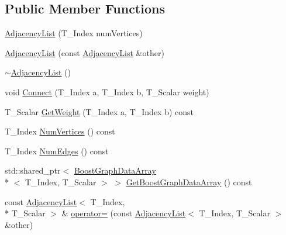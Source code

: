 \subsection*{Public Member Functions}
\begin{DoxyCompactItemize}
\item 
\hyperlink{class_undirected_weighted_graph_1_1_adjacency_list_a1a7c702a7ccd8ef53d155076961134cc}{Adjacency\+List} (T\+\_\+\+Index num\+Vertices)
\item 
\hyperlink{class_undirected_weighted_graph_1_1_adjacency_list_aec4427408ab6b840b2005e7e0273581d}{Adjacency\+List} (const \hyperlink{class_undirected_weighted_graph_1_1_adjacency_list}{Adjacency\+List} \&other)
\item 
\hyperlink{class_undirected_weighted_graph_1_1_adjacency_list_acb6a788f835b7b7417087b05c9932d64}{$\sim$\+Adjacency\+List} ()
\item 
void \hyperlink{class_undirected_weighted_graph_1_1_adjacency_list_a81740f79eb43d5904bc52944af0fe8ad}{Connect} (T\+\_\+\+Index a, T\+\_\+\+Index b, T\+\_\+\+Scalar weight)
\item 
T\+\_\+\+Scalar \hyperlink{class_undirected_weighted_graph_1_1_adjacency_list_a1de7ba4f3959d823bc4b3ce64335125f}{Get\+Weight} (T\+\_\+\+Index a, T\+\_\+\+Index b) const 
\item 
T\+\_\+\+Index \hyperlink{class_undirected_weighted_graph_1_1_adjacency_list_aa03bb66b3afd825e693edbedd77107db}{Num\+Vertices} () const 
\item 
T\+\_\+\+Index \hyperlink{class_undirected_weighted_graph_1_1_adjacency_list_a99e7675fa390f607b997774f82d90e3d}{Num\+Edges} () const 
\item 
std\+::shared\+\_\+ptr$<$ \hyperlink{struct_undirected_weighted_graph_1_1_graph_array}{BoostGraphData\+Array}\\*
$<$ T\+\_\+\+Index, T\+\_\+\+Scalar $>$ $>$ \hyperlink{class_undirected_weighted_graph_1_1_adjacency_list_a5abf86d74fe0bf2c56bd88c18714104b}{Get\+BoostGraphData\+Array} () const
\item 
const \hyperlink{class_undirected_weighted_graph_1_1_adjacency_list}{Adjacency\+List}$<$ T\+\_\+\+Index, \\*
T\+\_\+\+Scalar $>$ \& \hyperlink{class_undirected_weighted_graph_1_1_adjacency_list_a516dec9b2d05da8c64380e6e2a73befa}{operator=} (const \hyperlink{class_undirected_weighted_graph_1_1_adjacency_list}{Adjacency\+List}$<$ T\+\_\+\+Index, T\+\_\+\+Scalar $>$ \&other)
\end{DoxyCompactItemize}
